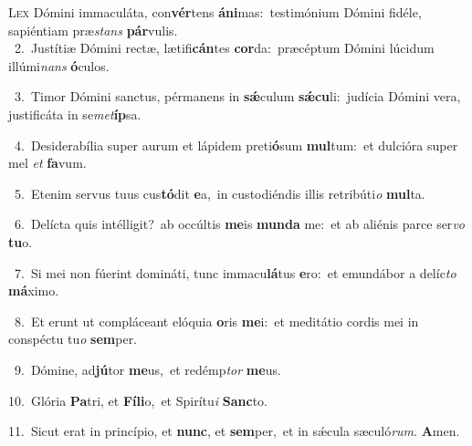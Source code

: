 \lettrine{\initial\textcolor{\initialcolor}{L}}{ex} Dómini immaculáta, con\-\textbf{vér}\-tens \textbf{á}\-\textbf{ni}mas:~\star testimónium Dómini fidéle, sapiéntiam præ\textit{stans} \textbf{pár}\-vulis.\\
{\numbfont\textcolor{\numbcolor}{~2.}}~Justítiæ Dómini rectæ, lætifi\-\textbf{cán}\-tes \textbf{cor}\-da:~\star præcéptum Dómini lúcidum illúmi\textit{nans} \textbf{ó}\-culos.\par
{\numbfont\textcolor{\numbcolor}{~3.}}~Timor Dómini sanctus, pérmanens in \textbf{sǽ}\-culum \textbf{sǽ}\-\textbf{cu}li:~\star judícia Dómini vera, justificáta in se\-\textit{met}\-\textbf{íp}sa.\par
{\numbfont\textcolor{\numbcolor}{~4.}}~Desiderabília super aurum et lápidem preti\-\textbf{ó}\-sum \textbf{mul}\-tum:~\star et dulcióra super mel \textit{et} \textbf{fa}\-vum.\par
{\numbfont\textcolor{\numbcolor}{~5.}}~Etenim servus tuus cus\-\textbf{tó}\-dit \textbf{e}\-a,~\star in custodiéndis illis retribúti\textit{o} \textbf{mul}\-ta.\par
{\numbfont\textcolor{\numbcolor}{~6.}}~Delícta quis intélligit?~\dagger ab occúltis \textbf{me}\-is \textbf{mun}\-\textbf{da} me:~\star et ab aliénis parce ser\textit{vo} \textbf{tu}\-o.\par
{\numbfont\textcolor{\numbcolor}{~7.}}~Si mei non fúerint domináti, tunc immacu\-\textbf{lá}\-tus \textbf{e}\-ro:~\star et emundábor a delíc\textit{to} \textbf{má}\-ximo.\par
{\numbfont\textcolor{\numbcolor}{~8.}}~Et erunt ut compláceant elóquia \textbf{o}\-ris \textbf{me}\-i:~\star et meditátio cordis mei in conspéctu tu\textit{o} \textbf{sem}\-per.\par
{\numbfont\textcolor{\numbcolor}{~9.}}~Dómine, ad\-\textbf{jú}\-tor \textbf{me}\-us,~\star et redémp\textit{tor} \textbf{me}\-us.\par
{\numbfont\textcolor{\numbcolor}{10.}}~Glória \textbf{Pa}\-tri, et \textbf{Fí}\-\textbf{li}o,~\star et Spirítu\textit{i} \textbf{Sanc}\-to.\par
{\numbfont\textcolor{\numbcolor}{11.}}~Sicut erat in princípio, et \textbf{nunc}\-, et \textbf{sem}\-per,~\star et in sǽcula sæculó\-\textit{rum}\-. \textbf{A}\-men.\par
